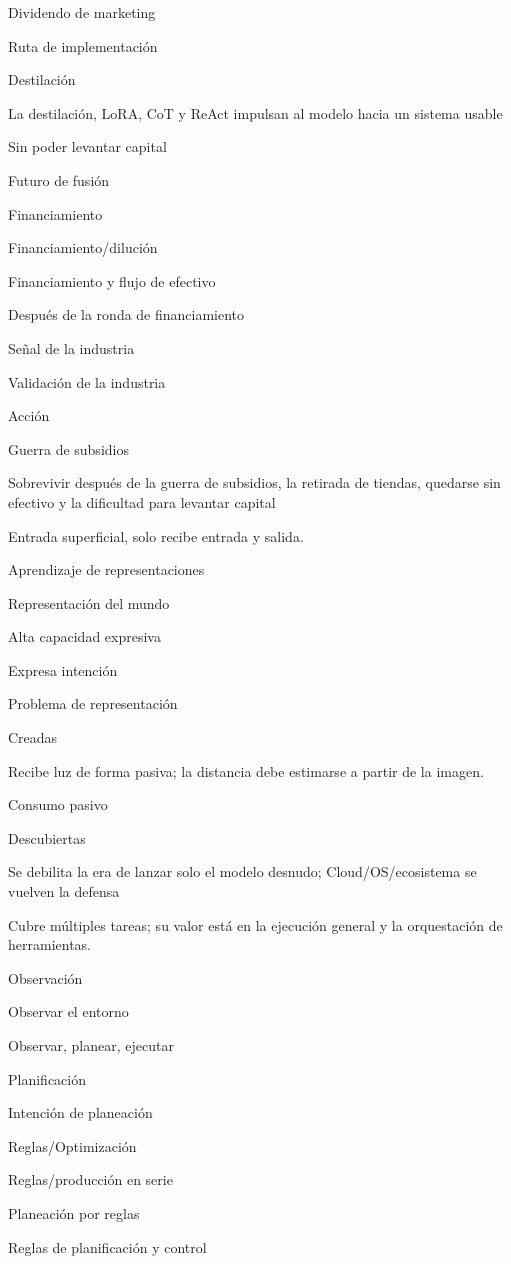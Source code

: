 \documentclass{article}
\begin{document}
Dividendo de marketing

Ruta de implementación

Destilación

La destilación, LoRA, CoT y ReAct impulsan al modelo hacia un sistema usable

Sin poder levantar capital

Futuro de fusión

Financiamiento

Financiamiento/dilución

Financiamiento y flujo de efectivo

Después de la ronda de financiamiento

Señal de la industria

Validación de la industria

Acción

Guerra de subsidios

Sobrevivir después de la guerra de subsidios, la retirada de tiendas, quedarse sin efectivo y la dificultad para levantar capital

Entrada superficial, solo recibe entrada y salida.

Aprendizaje de representaciones

Representación del mundo

Alta capacidad expresiva

Expresa intención

Problema de representación

Creadas

Recibe luz de forma pasiva; la distancia debe estimarse a partir de la imagen.

Consumo pasivo

Descubiertas

Se debilita la era de lanzar solo el modelo desnudo; Cloud/OS/ecosistema se vuelven la defensa

Cubre múltiples tareas; su valor está en la ejecución general y la orquestación de herramientas.

Observación

Observar el entorno

Observar, planear, ejecutar

Planificación

Intención de planeación

Reglas/Optimización

Reglas/producción en serie

Planeación por reglas

Reglas de planificación y control
\end{document}
